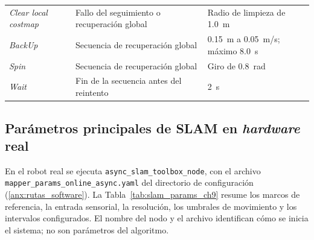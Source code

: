 \begin{appendices}
\begin{table}[H]
\begin{tabular}{p{3.6cm} p{4.8cm} p{5.2cm}}
\textit{Clear local costmap} &
Fallo del seguimiento o recuperación global &
Radio de limpieza de 1.0~m \\

\textit{BackUp} &
Secuencia de recuperación global &
0.15~m a 0.05~m/s; máximo 8.0~s \\

\textit{Spin} &
Secuencia de recuperación global &
Giro de 0.8~rad \\

\textit{Wait} &
Fin de la secuencia antes del reintento &
2~s \\
\bottomrule
\end{tabular}
\end{table}

\subsection{Parámetros principales de SLAM en \texorpdfstring{\textit{hardware}}{hardware} real}

En el robot real se ejecuta \texttt{async\_slam\_toolbox\_node}, con el archivo
\texttt{mapper\_\allowbreak{}params\_\allowbreak{}online\_\allowbreak{}async.yaml}
del directorio de configuración
(\ref{anx:rutas_software}). La Tabla~\ref{tab:slam_params_ch9} resume los
marcos de referencia, la entrada sensorial, la resolución, los umbrales de
movimiento y los intervalos configurados. El nombre del nodo y el archivo
identifican cómo se inicia el sistema; no son parámetros del algoritmo.


\end{appendices}
